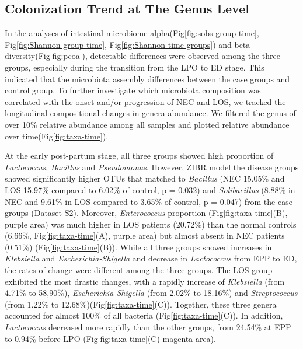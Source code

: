 \documentclass[fleqn,10pt]{wlpeerj} %
\begin{document}

  \subsection*{Colonization Trend at The Genus Level}
  In the analyses of intestinal microbiome alpha(Fig\ref{fig:sobs-group-time}, Fig\ref{fig:Shannon-group-time}, Fig\ref{fig:Shannon-time-groups}) and beta diversity(Fig\ref{fig:pcoa}), detectable differences were observed among the three groups, especially during the transition from the LPO to ED stage.  This indicated that the microbiota assembly differences between the case groups and control group. To further investigate which microbiota composition was correlated with the onset and/or progression of NEC and LOS, we tracked the longitudinal compositional changes in genera abundance. We filtered the genus of over 10\% relative abundance among all samples and plotted relative abundance over time(Fig\ref{fig:taxa-time}).

    At the early post-partum stage, all three groups showed high proportion of \textit{Lactococcus}, \textit{Bacillus} and \textit{Pseudomonas}. However, ZIBR model the disease groups showed significantly higher OTUs that matched to \textit{Bacillus} (NEC 15.05\% and LOS 15.97\% compared to 6.02\% of control, p = 0.032) and \textit{Solibacillus} (8.88\% in NEC and 9.61\% in LOS compared to 3.65\% of control, p = 0.047) from the case groups (Dataset S2). Moreover, \textit{Enterococcus} proportion (Fig\ref{fig:taxa-time}(B), purple area) was much higher in LOS patients (20.72\%) than the normal controls (6.66\%, Fig\ref{fig:taxa-time}(A), purple area) but almost absent in NEC patients (0.51\%) (Fig\ref{fig:taxa-time}(B)).  While all three groups showed increases in \textit{Klebsiella} and \textit{Escherichia-Shigella} and decrease in \textit{Lactococcus} from EPP to ED, the rates of change were different among the three groups.  The LOS group exhibited the most drastic changes, with a rapidly increase of \textit{Klebsiella} (from 4.71\% to 58,90\%), \textit{Escherichia-Shigella} (from 2.02\% to 18.16\%) and \textit{Streptococcus} (from 1.22\% to 12.68\%)(Fig\ref{fig:taxa-time}(C)).  Together, these three genera accounted for almost 100\% of all bacteria (Fig\ref{fig:taxa-time}(C)). In addition, \textit{Lactococcus} decreased more rapidly than the other groups, from 24.54\% at EPP to 0.94\% before LPO (Fig\ref{fig:taxa-time}(C) magenta area).
\end{document}
